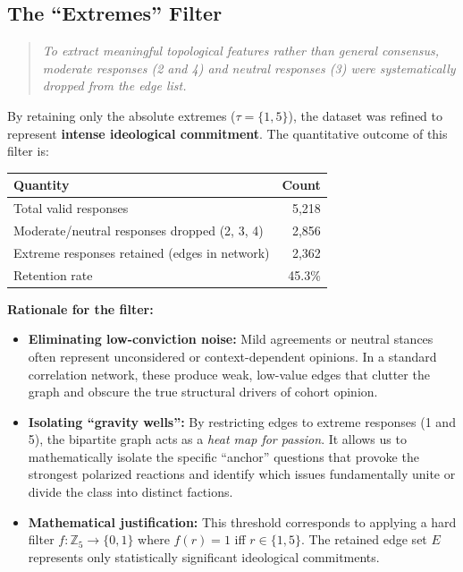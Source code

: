 \documentclass[11pt, a4paper]{article}
\begin{document}
\subsection{The ``Extremes'' Filter}

\begin{quote}
\textit{To extract meaningful topological features rather than general consensus, moderate responses (2 and 4) and neutral responses (3) were systematically dropped from the edge list.}
\end{quote}

By retaining only the absolute extremes ($\tau = \{1, 5\}$), the dataset was refined to represent \textbf{intense ideological commitment}. The quantitative outcome of this filter is:

\begin{center}
\begin{tabular}{lr}
\toprule
\textbf{Quantity} & \textbf{Count} \\
\midrule
Total valid responses & 5,218 \\
Moderate/neutral responses dropped (2, 3, 4) & 2,856 \\
Extreme responses retained (edges in network) & 2,362 \\
Retention rate & 45.3\% \\
\bottomrule
\end{tabular}
\end{center}

\textbf{Rationale for the filter:}
\begin{itemize}
    \item \textbf{Eliminating low-conviction noise:} Mild agreements or neutral stances often represent unconsidered or context-dependent opinions. In a standard correlation network, these produce weak, low-value edges that clutter the graph and obscure the true structural drivers of cohort opinion.
    \item \textbf{Isolating ``gravity wells'':} By restricting edges to extreme responses (1 and 5), the bipartite graph acts as a \textit{heat map for passion}. It allows us to mathematically isolate the specific ``anchor'' questions that provoke the strongest polarized reactions and identify which issues fundamentally unite or divide the class into distinct factions.
    \item \textbf{Mathematical justification:} This threshold corresponds to applying a hard filter $f: \mathbb{Z}_5 \to \{0, 1\}$ where $f(r) = 1$ iff $r \in \{1, 5\}$. The retained edge set $E$ represents only statistically significant ideological commitments.
\end{itemize}
\end{document}
